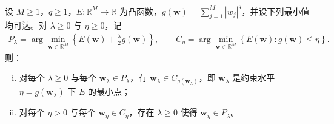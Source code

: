 \documentclass[../../main.tex]{subfiles}
\begin{document}
\begin{proposition}\label{proposition:ch09-lasso约束等价}
设 $M\geqslant1$，$q\geqslant1$，$E:\mathbb{R}^{M}\to\mathbb{R}$ 为凸函数，$g(\boldsymbol{w})=\sum_{j=1}^{M}|w_{j}|^{q}$，并设下列最小值均可达。对 $\lambda\geqslant0$ 与 $\eta\geqslant0$，记
\begin{align*}
P_{\lambda}=\arg\min_{\boldsymbol{w}\in\mathbb{R}^{M}}\left\{E(\boldsymbol{w})+\frac{\lambda}{2}g(\boldsymbol{w})\right\},\qquad
C_{\eta}=\arg\min_{\boldsymbol{w}\in\mathbb{R}^{M}}\left\{E(\boldsymbol{w}):g(\boldsymbol{w})\leqslant\eta\right\}.
\end{align*}
则：
\begin{enumerate}[(i)]
\item 对每个 $\lambda\geqslant0$ 与每个 $\boldsymbol{w}_{\lambda}\in P_{\lambda}$，有 $\boldsymbol{w}_{\lambda}\in C_{g(\boldsymbol{w}_{\lambda})}$，即 $\boldsymbol{w}_{\lambda}$ 是约束水平 $\eta=g(\boldsymbol{w}_{\lambda})$ 下 $E$ 的最小点；
\item 对每个 $\eta>0$ 与每个 $\boldsymbol{w}_{\eta}\in C_{\eta}$，存在 $\lambda\geqslant0$ 使得 $\boldsymbol{w}_{\eta}\in P_{\lambda}$。
\end{enumerate}
\end{proposition}
\end{document}
